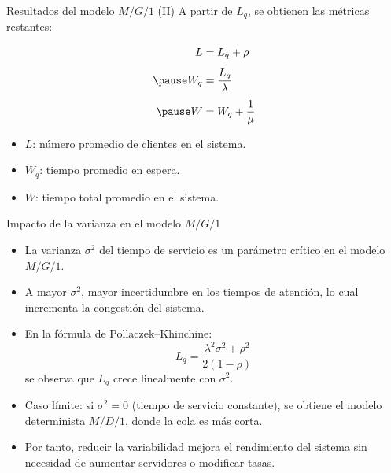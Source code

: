 \documentclass{beamer}
\begin{document}
\begin{frame}{Resultados del modelo \texorpdfstring{$M/G/1$}{M/G/1} (II)}
  A partir de \( L_q \), se obtienen las métricas restantes:

  \pause
  \begin{align*}
    L &= L_q + \rho \\[1ex] \pause
    W_q &= \frac{L_q}{\lambda} \\[1ex] \pause
    W &= W_q + \frac{1}{\mu}
  \end{align*}

  \pause
  \begin{itemize}
    \item \( L \): número promedio de clientes en el sistema.
    \item \( W_q \): tiempo promedio en espera.
    \item \( W \): tiempo total promedio en el sistema.
  \end{itemize}
\end{frame}

\begin{frame}{Impacto de la varianza en el modelo \texorpdfstring{$M/G/1$}{M/G/1}}
  \begin{itemize}
    \item La varianza \( \sigma^2 \) del tiempo de servicio es un parámetro crítico en el modelo \( M/G/1 \). \pause

    \item A mayor \( \sigma^2 \), mayor incertidumbre en los tiempos de atención, lo cual incrementa la congestión del sistema. \pause

    \item En la fórmula de Pollaczek--Khinchine:
    \[
    L_q = \frac{\lambda^2 \sigma^2 + \rho^2}{2(1 - \rho)}
    \]
    se observa que \( L_q \) crece linealmente con \( \sigma^2 \). \pause

    \item Caso límite: si \( \sigma^2 = 0 \) (tiempo de servicio constante), se obtiene el modelo determinista \( M/D/1 \), donde la cola es más corta. \pause

    \item Por tanto, reducir la variabilidad mejora el rendimiento del sistema sin necesidad de aumentar servidores o modificar tasas.
  \end{itemize}
\end{frame}
\end{document}
